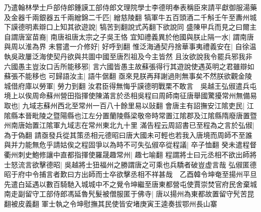 乃遣翰林學士戶部侍郎鍾謨工部侍郎文理院學士李德明奉表稱臣來請平獻御服湯藥及金器千兩銀器五千兩繒錦二千匹|{
	繒慈陵翻}
犒軍牛五百頭酒二千斛壬午至夀州城下謨德明素辯口上知其欲遊說|{
	犒苦到翻說式芮翻下欲說同}
盛陳甲兵而見之曰爾主自謂唐室苗裔|{
	南唐祖唐太宗之子吳王恪}
宜知禮義異於他國與朕止隔一水|{
	謂南唐與周以淮為界}
未嘗遣一介修好|{
	好呼到翻}
惟泛海通契丹捨華事夷禮義安在|{
	自徐温執吳政屢泛海使契丹欲與共圖中國至唐烈祖及今主皆然}
且汝欲說我令罷兵邪我非六國愚主豈汝口舌所能移邪|{
	言六國皆愚主故蘇張得行其遊說使遇英明之君雖辯如蘇張不能移也}
可歸語汝主|{
	語牛倨翻}
亟來見朕再拜謝過則無事矣不然朕欲觀金陵城借府庫以勞軍|{
	勞力到翻}
汝君臣得無悔乎謨德明戰栗不敢言　吳越王弘俶遣兵屯境上以俟周命蘇州營田指揮使陳滿言於丞相吳程曰周師南征唐舉國驚擾常州無備易取也|{
	九域志蘇州西北至常州一百八十餘里易以䜴翻}
會唐主有詔撫安江隂吏民|{
	江隂縣本晉毗陵之暨陽縣也江左分置蘭陵縣梁敬帝時常置江隂郡及江隂縣隋廢唐置暨州南唐始置江隂軍九域志在常州東北九十里}
滿告程云周詔書已至程為之言於弘俶|{
	為于偽翻}
請亟發兵從其策丞相元德昭曰唐大國未可輕也若我入唐境而周師不至誰與并力能無危乎請姑俟之程固爭以為時不可失弘俶卒從程議|{
	卒子恤翻}
癸未遣程督衢州刺史鮑修讓中直都指揮使羅晟趣常州|{
	趣七喻翻}
程謂將士曰元丞相不欲出師將士怒流言欲擊德昭|{
	吳越將士狃福州之勝謂唐之可乘也兵驕者破豈虚言哉}
弘俶匿德昭于府中令捕言者歎曰方出師而士卒欲擊丞相不祥甚哉　乙酉韓令坤奄至揚州平旦先遣白延遇以數百騎馳入城城中不之覺令坤繼至唐東都營屯使賈崇焚官府民舍棄城南走副留守工部侍郎馮延魯髠髮被僧服匿于佛寺|{
	唐以揚州為東都故置留守髠苦昆翻被皮義翻}
軍士執之令坤慰撫其民使皆安堵庚寅王逵奏拔鄂州長山寨

